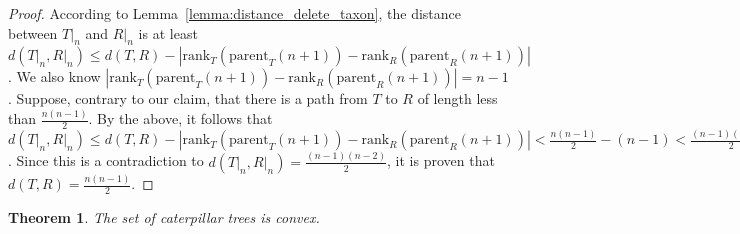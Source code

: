 \documentclass{amsart}
\newcommand{\parent}{\mathrm{parent}}
\newcommand{\rank}{\mathrm{rank}}
\newtheorem{theorem}[definition]{Theorem}
\begin{document}
\begin{proof}
    According to Lemma~\ref{lemma:distance_delete_taxon}, the distance between $T{\big|}_n$ and $R{\big|}_n$ is at least $d(T{\big|}_n, R{\big|}_n) \leq d(T,R) - |\rank_T(\parent_T(n+1)) - \rank_R(\parent_R(n+1))|$.
    We also know $|\rank_T(\parent_T(n+1)) - \rank_R(\parent_R(n+1))| = n-1$.
    Suppose, contrary to our claim, that there is a path from $T$ to $R$ of length less than $\frac{n(n-1)}{2}$.
    By the above, it follows that $d(T{\big|}_n, R{\big|}_n) \leq d(T,R) - |\rank_T(\parent_T(n+1)) - \rank_R(\parent_R(n+1))| < \frac{n(n-1)}{2} - (n-1) < \frac{(n-1)(n-2)}{2}$.
    Since this is a contradiction to $d(T{\big|}_n, R{\big|}_n) = \frac{(n-1)(n-2)}{2}$, it is proven that $d(T,R) = \frac{n(n-1)}{2} $.
\end{proof}

\begin{theorem}
    The set of caterpillar trees is convex.
    \label{thm:caterpillar_convex}
\end{theorem}
\end{document}
